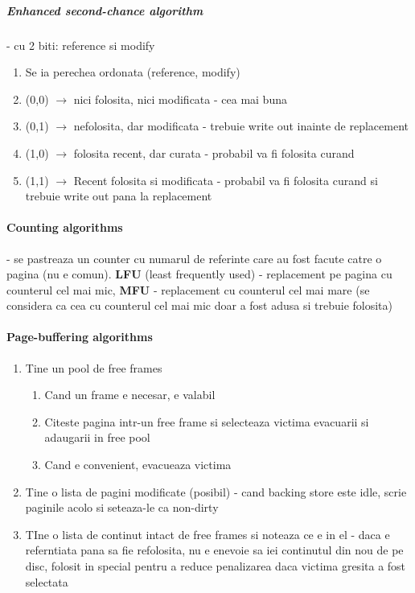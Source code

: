 \documentclass{article}
\begin{document}
\subparagraph*{Enhanced second-chance algorithm} - cu 2 biti: reference si modify
\begin{enumerate}
    \item Se ia perechea ordonata (reference, modify)
    \item (0,0) $\rightarrow$ nici folosita, nici modificata - cea mai buna
    \item (0,1) $\rightarrow$ nefolosita, dar modificata - trebuie write out inainte de replacement
    \item (1,0) $\rightarrow$ folosita recent, dar curata - probabil va fi folosita curand
    \item (1,1) $\rightarrow$ Recent folosita si modificata - probabil va fi folosita curand si trebuie write out pana la replacement
\end{enumerate}

\paragraph*{Counting algorithms} - se pastreaza un counter cu numarul de referinte care au fost facute catre o pagina (nu e comun). \textbf{LFU} (least frequently used) - replacement pe pagina cu counterul cel mai mic, \textbf{MFU} - replacement cu counterul cel mai mare (se considera ca cea cu counterul cel mai mic doar a fost adusa si trebuie folosita)

\paragraph*{Page-buffering algorithms}
\begin{enumerate}
    \item Tine un pool de free frames
          \begin{enumerate}
              \item Cand un frame e necesar, e valabil
              \item Citeste pagina intr-un free frame si selecteaza victima evacuarii si adaugarii in free pool
              \item Cand e convenient, evacueaza victima
          \end{enumerate}
    \item Tine o lista de pagini modificate (posibil) - cand backing store este idle, scrie paginile acolo si seteaza-le ca non-dirty
    \item TIne o lista de continut intact de free frames si noteaza ce e in el - daca e referntiata pana sa fie refolosita, nu e enevoie sa iei continutul din nou de pe disc, folosit in special pentru a reduce penalizarea daca victima gresita a fost selectata
\end{enumerate}
\end{document}
